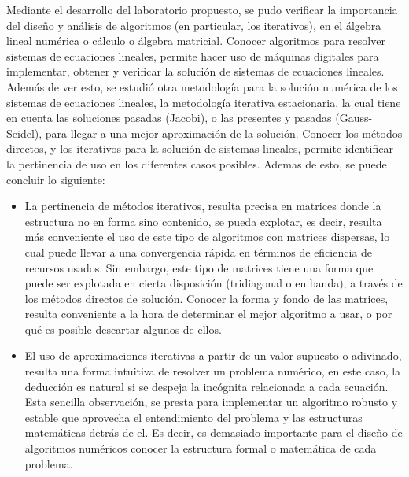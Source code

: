 \documentclass[11pt, spanish]{article}
\begin{document}
Mediante el desarrollo del laboratorio propuesto, se pudo verificar la importancia del diseño y análisis de algoritmos (en particular, los iterativos), en el álgebra lineal numérica o cálculo o álgebra matricial. Conocer algoritmos para resolver sistemas de ecuaciones lineales, permite hacer uso de máquinas digitales para implementar, obtener y verificar la solución de sistemas de ecuaciones lineales. Además de ver esto, se estudió otra metodología para la solución numérica de los sistemas de ecuaciones lineales, la metodología iterativa estacionaria, la cual tiene en cuenta las soluciones pasadas (Jacobi), o las presentes y pasadas (Gauss-Seidel), para llegar a una mejor aproximación de la solución. Conocer los métodos directos, y los iterativos para la solución de sistemas lineales, permite identificar la pertinencia de uso en los diferentes casos posibles. Ademas de esto, se puede concluir lo siguiente:

\begin{itemize}

\item La pertinencia de métodos iterativos, resulta precisa en matrices donde la estructura no en forma sino contenido, se pueda explotar, es decir, resulta más conveniente el uso de este tipo de algoritmos con matrices dispersas, lo cual puede llevar a una convergencia rápida en términos de eficiencia de recursos usados. Sin embargo, este tipo de matrices tiene una forma que puede ser explotada en cierta disposición (tridiagonal o en banda), a través de los métodos directos de solución. Conocer la forma y fondo de las matrices, resulta conveniente a la hora de determinar el mejor algoritmo a usar, o por qué es posible descartar algunos de ellos.
  
   \item El uso de aproximaciones iterativas a partir de un valor supuesto o adivinado, resulta una forma intuitiva de resolver un problema numérico, en este caso, la deducción es natural si se despeja la incógnita relacionada a cada ecuación. Esta sencilla observación, se presta para implementar un algoritmo robusto y estable que aprovecha el entendimiento del problema y las estructuras matemáticas detrás de el. Es decir, es demasiado importante para el diseño de algoritmos numéricos conocer la estructura formal o matemática de cada problema.
   
\end{itemize}


\newpage
\end{document}

